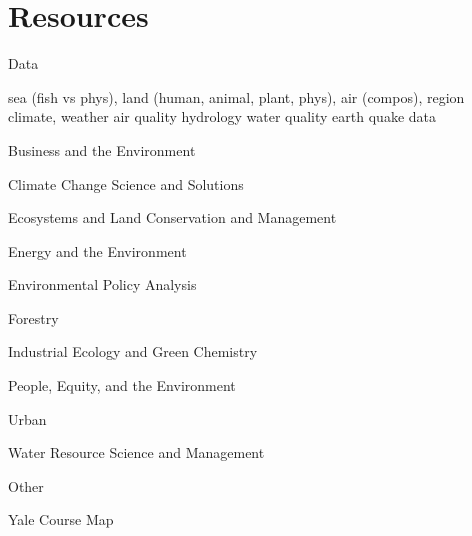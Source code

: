 \documentclass[
]{book}
\begin{document}
\hypertarget{resources}{%
\chapter{Resources}\label{resources}}

Data

sea (fish vs phys), land (human, animal, plant, phys), air (compos), region
climate, weather
air quality
hydrology
water quality
earth quake data

Business and the Environment

Climate Change Science and Solutions

Ecosystems and Land Conservation and Management

Energy and the Environment

Environmental Policy Analysis

Forestry

Industrial Ecology and Green Chemistry

People, Equity, and the Environment

Urban

Water Resource Science and Management

Other

Yale Course Map

  
\end{document}
